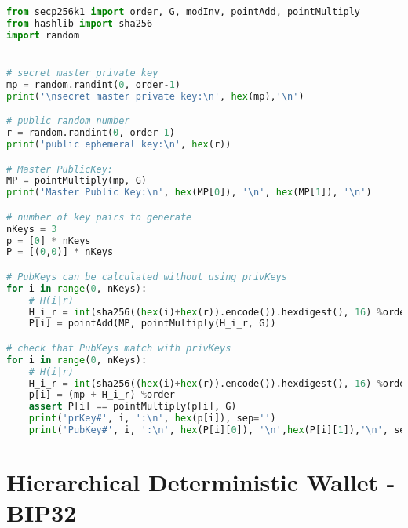 \begin{lstlisting}[language=Python]
from secp256k1 import order, G, modInv, pointAdd, pointMultiply
from hashlib import sha256
import random


# secret master private key
mp = random.randint(0, order-1)
print('\nsecret master private key:\n', hex(mp),'\n')

# public random number
r = random.randint(0, order-1)
print('public ephemeral key:\n', hex(r))

# Master PublicKey:
MP = pointMultiply(mp, G)
print('Master Public Key:\n', hex(MP[0]), '\n', hex(MP[1]), '\n')

# number of key pairs to generate
nKeys = 3
p = [0] * nKeys
P = [(0,0)] * nKeys

# PubKeys can be calculated without using privKeys
for i in range(0, nKeys):
	# H(i|r)
	H_i_r = int(sha256((hex(i)+hex(r)).encode()).hexdigest(), 16) %order
	P[i] = pointAdd(MP, pointMultiply(H_i_r, G))                 

# check that PubKeys match with privKeys
for i in range(0, nKeys):
	# H(i|r)
	H_i_r = int(sha256((hex(i)+hex(r)).encode()).hexdigest(), 16) %order
	p[i] = (mp + H_i_r) %order
	assert P[i] == pointMultiply(p[i], G)
	print('prKey#', i, ':\n', hex(p[i]), sep='')
	print('PubKey#', i, ':\n', hex(P[i][0]), '\n',hex(P[i][1]),'\n', sep='')
\end{lstlisting}




\section{Hierarchical Deterministic Wallet - BIP32}

